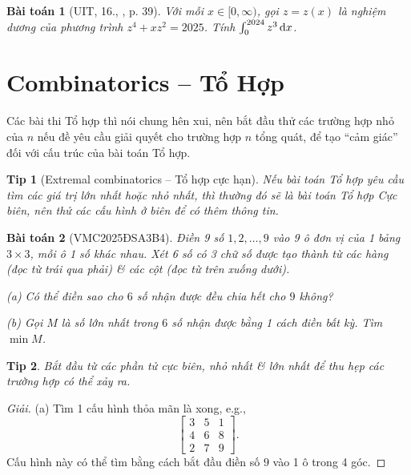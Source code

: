 \documentclass{article}
\newtheorem{baitoan}{Bài toán}
\newtheorem{tip}{Tip}
\begin{document}
\begin{baitoan}[UIT, 16., \cite{VMS_VMC2025}, p. 39]
	Với mỗi $x\in[0,\infty)$, gọi $z = z(x)$ là nghiệm dương của phương trình $z^4 + xz^2 = 2025$. Tính $\int_0^{2024} z^3\,{\rm d}x$.
\end{baitoan}


\section{Combinatorics -- Tổ Hợp}
Các bài thi Tổ hợp thì nói chung hên xui, nên bắt đầu thử các trường hợp nhỏ của $n$ nếu đề yêu cầu giải quyết cho trường hợp $n$ tổng quát, để tạo ``cảm giác'' đối với cấu trúc của bài toán Tổ hợp.

\begin{tip}[Extremal combinatorics -- Tổ hợp cực hạn]
	Nếu bài toán Tổ hợp yêu cầu tìm các giá trị lớn nhất hoặc nhỏ nhất, thì thường đó sẽ là bài toán Tổ hợp Cực biên, nên thử các cấu hình ở biên để có thêm thông tin.
\end{tip}

\begin{baitoan}[VMC2025ĐSA3B4]
	Điền 9 số $1,2,\ldots,9$ vào 9 ô đơn vị của 1 bảng $3\times3$, mỗi ô 1 số khác nhau. Xét 6 số có 3 chữ số được tạo thành từ các hàng (đọc từ trái qua phải) \& các cột (đọc từ trên xuống dưới).
	\item(a) Có thể điền sao cho $6$ số nhận được đều chia hết cho $9$ không?
	\item(b) Gọi $M$ là số lớn nhất trong $6$ số nhận được bằng 1 cách điền bất kỳ. Tìm $\min M$.
\end{baitoan}

\begin{tip}
	Bắt đầu từ các phần tử cực biên, nhỏ nhất \& lớn nhất để thu hẹp các trường hợp có thể xảy ra.
\end{tip}

\begin{proof}[Giải]
	(a) Tìm 1 cấu hình thỏa mãn là xong, e.g.,
	\begin{equation*}
		\begin{bmatrix}
			3 & 5 & 1\\4 & 6 & 8\\2 & 7 & 9
		\end{bmatrix}.
	\end{equation*}
	Cấu hình này có thể tìm bằng cách bắt đầu điền số $9$ vào 1 ô trong 4 góc.
\end{proof}
\end{document}
